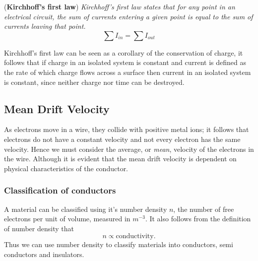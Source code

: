 \begin{theorem}{(\textbf{Kirchhoff's first law})}
\textit{Kirchhoff's first law states that for any point in an electrical circuit, the sum of currents entering a given point is equal to the sum of currents leaving that point. }
\begin{equation}
    \sum I_{in} = \sum I_{out}
\end{equation}
\end{theorem}

Kirchhoff's first law can be seen as a corollary of the conservation of charge, it follows that if charge in an isolated system is constant and current is defined as the rate of which charge flows across a surface then current in an isolated system is constant, since neither charge nor time can be destroyed.

\subsection{Mean Drift Velocity}

As electrons move in a wire, they collide with positive metal ions; it follows that electrons do not have a constant velocity and not every electron has the same velocity. Hence we must consider the average, or \textit{mean}, velocity of the electrons in the wire. Although it is evident that the mean drift velocity is dependent on physical characteristics of the conductor.

\subsubsection{Classification of conductors}

A material can be classified using it's number density $n$, the number of free electrons per unit of volume, measured in $m^{-3}$. It also follows from the definition of number density that
\begin{equation*}
    n \propto \text{conductivity}.
\end{equation*}
Thus we can use number density to classify materials into conductors, semi conductors and insulators. 

\begin{table}[h!]
    \centering
\end{table}
\FloatBarrier

